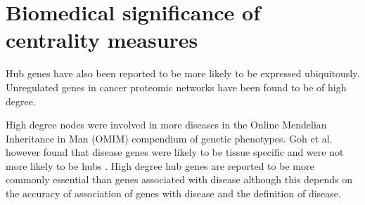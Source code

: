 \section{Biomedical significance of centrality measures}
 \label{sec:biomedical significance of centrality measures}
 
Hub genes have also been reported to be more likely to be expressed ubiquitously\cite{goh2007human}. Unregulated genes in cancer proteomic networks have been found to be of high degree\cite{wachi2005interactome}. 

 High degree nodes were involved in more diseases in the Online Mendelian Inheritance in Man (OMIM) compendium of genetic phenotypes\cite{xu2006discovering}. Goh et al. however found that disease genes were likely to be tissue specific and were not more likely to be hubs \cite{goh2007human}.  High degree hub genes are reported to be more commonly essential than genes associated with disease\cite{barabasi2011network} although this depends on the accuracy of association of genes with disease and the definition of disease. 

